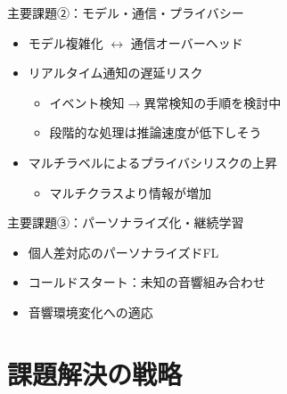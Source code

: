 \documentclass[unicode,12pt,aspectratio=169,dvipdfmx]{beamer}
\begin{document}
\begin{frame}{主要課題②：モデル・通信・プライバシー}
  \begin{itemize}
    \item モデル複雑化 \(\leftrightarrow\)  通信オーバーヘッド
    \item リアルタイム通知の遅延リスク
    \begin{itemize}
        \item イベント検知\(\rightarrow\)異常検知の手順を検討中
        \item 段階的な処理は推論速度が低下しそう
    \end{itemize}
    \item マルチラベルによるプライバシリスクの上昇
    \begin{itemize}
        \item マルチクラスより情報が増加
    \end{itemize}
\end{itemize}
\end{frame}
\begin{frame}{主要課題③：パーソナライズ化・継続学習}
  \begin{itemize}
    \item 個人差対応のパーソナライズドFL
    \item コールドスタート：未知の音響組み合わせ
    \item 音響環境変化への適応
  \end{itemize}
\end{frame}
\section{課題解決の戦略}

\end{document}

